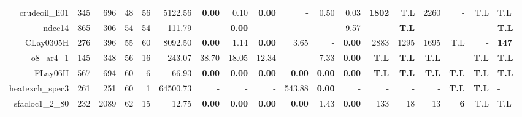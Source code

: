 \begin{table*}[t]
\begin{tabular}{|r|r|r|r|r||r||r|r|r|r|r||r|r|r|r|r|r|}
                    crudeoil\_li01 &          345 &           696 &           48 &            56 &             5122.56 &  \textbf{0.00} &           0.10 & \textbf{0.00} &              - &          0.50 &          0.03 &      \textbf{1802} &                T.L &               2260 &                  - &          T.L &          T.L \\ 
                            ndcc14 &          865 &           306 &           54 &            54 &              111.79 &              - &  \textbf{0.00} &             - &              - &             - &          9.57 &                  - &       \textbf{T.L} &                  - &                  - &            - & \textbf{T.L} \\ 
                         CLay0305H &          276 &           396 &           55 &            60 &             8092.50 &  \textbf{0.00} &           1.14 & \textbf{0.00} &           3.65 &             - & \textbf{0.00} &               2883 &               1295 &               1695 &                T.L &            - & \textbf{147} \\ 
                        o8\_ar4\_1 &          145 &           348 &           56 &            16 &              243.07 &          38.70 &          18.05 &         12.34 &              - &          7.33 & \textbf{0.00} &       \textbf{T.L} &       \textbf{T.L} &       \textbf{T.L} &                  - & \textbf{T.L} & \textbf{T.L} \\ 
                           FLay06H &          567 &           694 &           60 &             6 &               66.93 &  \textbf{0.00} &  \textbf{0.00} & \textbf{0.00} &  \textbf{0.00} & \textbf{0.00} & \textbf{0.00} &       \textbf{T.L} &       \textbf{T.L} &       \textbf{T.L} &       \textbf{T.L} & \textbf{T.L} & \textbf{T.L} \\ 
                   heatexch\_spec3 &          261 &           251 &           60 &             1 &            64500.73 &              - &              - &             - &         543.88 & \textbf{0.00} &             - &                  - &                  - &                  - &       \textbf{T.L} & \textbf{T.L} &            - \\ 
                   sfacloc1\_2\_80 &          232 &          2089 &           62 &            15 &               12.75 &  \textbf{0.00} &  \textbf{0.00} & \textbf{0.00} &  \textbf{0.00} &          1.43 & \textbf{0.00} &                133 &                 18 &                 13 &         \textbf{6} &          T.L &          T.L \\ 

\end{tabular}
\end{table*}
